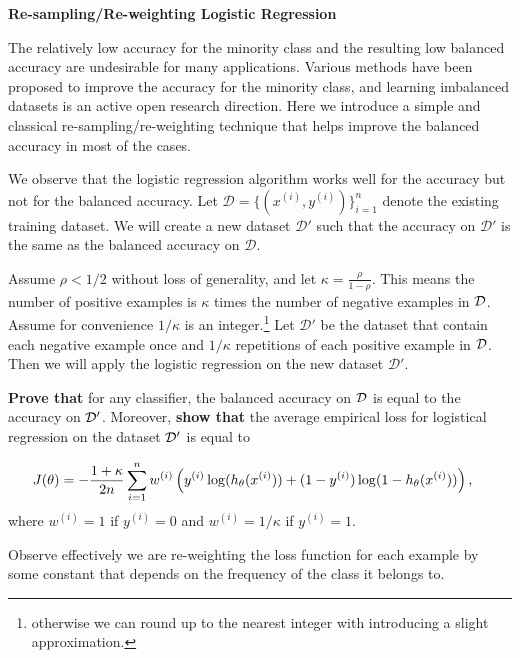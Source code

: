 \item {} \textbf{Re-sampling/Re-weighting Logistic Regression}

The relatively low accuracy for the minority class and the resulting low balanced accuracy are undesirable for many applications. Various methods have been proposed to improve the accuracy for the minority class, and learning imbalanced datasets is  an active open research direction. Here we introduce a simple and classical re-sampling/re-weighting technique that helps improve the balanced accuracy in most of the cases. 

We observe that the logistic regression algorithm works well for the accuracy but not for the balanced accuracy. Let $\mathcal{D} = \{(x^{(i)}, y^{(i)})\}_{i=1}^n$ denote the existing training dataset. We will create a new dataset $\mathcal{D}'$ such that the accuracy on $\mathcal{D}'$ is the same as the balanced accuracy on $\mathcal{D}$.

Assume $\rho < 1/2$ without loss of generality, and let $\kappa = \frac{\rho}{1-\rho}$. This means the number of positive examples is $\kappa$ times the number of negative examples in $\mathcal{D}$. Assume for convenience $1/\kappa$ is an integer.\footnote{otherwise we can round up to the nearest integer with introducing a slight approximation.} Let $\mathcal{D}'$ be the dataset that contain each negative example once and $1/\kappa$ repetitions of each positive example in $\mathcal{D}$. Then we will apply the logistic regression on the new dataset $\mathcal{D}'$.  

{\bf Prove that} for any classifier, the balanced accuracy on $\mathcal{D}$ is equal to the accuracy on $\mathcal{D}'$. Moreover, {\bf show that} the average empirical loss for logistical regression on the dataset $\mathcal{D}'$ is equal to 


\begin{align*}
J(\theta) &= -\frac{1+\kappa}{2n} \sum_{i=1}^{n} w^{(i)} \left(y^{(i)}\log(h_{\theta}(x^{(i)}))
+  (1 - y^{(i)})\log(1 - h_{\theta}(x^{(i)}))\right),
\end{align*}
where $w^{(i)} = 1$ if $y^{(i)} =0$ and $w^{(i)} = 1/\kappa$ if $y^{(i)} = 1$.


Observe effectively we are re-weighting the loss function for each example by some constant that depends on the frequency of the class it belongs to.


